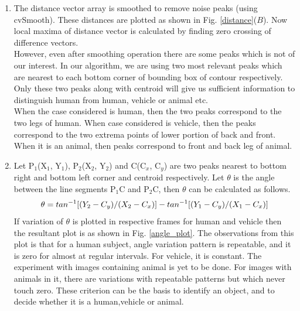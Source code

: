 \documentclass[conference]{IEEEtran}
\begin{document}
\begin{enumerate}
\item The distance vector array is smoothed to remove noise peaks (using
cvSmooth). These distances are plotted  as shown in Fig.
\ref{distance}($B$). Now local maxima of distance vector is calculated
by finding zero crossing of difference vectors.\\
\indent However, even after smoothing operation there are some peaks which is
not of our interest.  In our algorithm, we are using two most relevant
peaks which are nearest to each bottom corner of bounding box of contour
respectively.  Only these two peaks along with centroid will give us
sufficient information to distinguish human from human, vehicle or
animal etc. \\
\indent When the case considered is human, then the two peaks correspond to
the two legs of human. When case considered is vehicle, then the peaks
correspond to the two extrema points of lower portion of back and front.
When it is an animal, then peaks correspond to front and back leg of
animal.\\
\item Let P$_1$(X$_1$, Y$_1$), P$_2$(X$_2$, Y$_2$) and C(C$_x$, C$_y$)
are two peaks nearest to bottom right and bottom left corner and
centroid respectively. Let $\theta$ is the angle between the line
segments P$_1$C and P$_2$C, then $\theta$ can be calculated as
follows.\\
%
	\begin{equation}
	\theta = tan^{-1}[(Y_2 - C_y) / (X_2 - C_x)] \\ - tan^{-1}[(Y_1 - C_y) / (X_1 - C_x)]
	\end{equation}
%
\indent If variation of $\theta$ is plotted in respective frames for
human and vehicle then the resultant plot is as shown in Fig.
\ref{angle_plot}.  The observations from this plot is that for a  human
subject, angle variation pattern is repeatable, and it is zero for
almost at regular intervals.  For vehicle, it is constant. The
experiment with images containing animal is yet to be done. For images
with animals in it, there are variations with repeatable patterns but
which never touch zero.  These criterion can be the basis to identify an
object, and to decide whether it is a human,vehicle or animal.


\end{enumerate}
\end{document}
